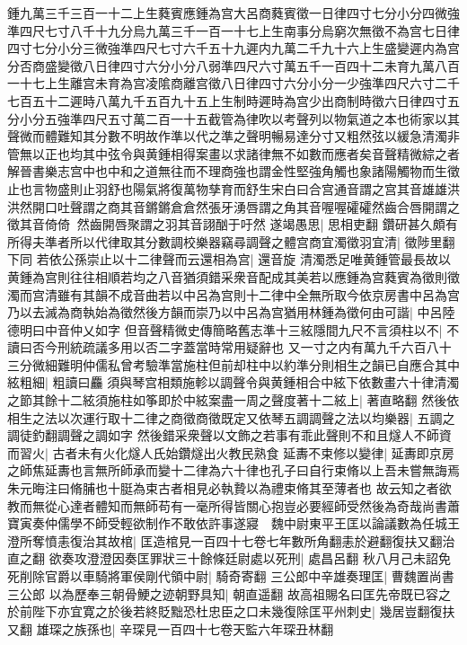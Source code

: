 {鍾九萬三千三百一十二上生蕤賓應鍾為宫大呂商蕤賓徵一日律四寸七分小分四微強準四尺七寸八千十九分烏九萬三千一百一十七上生南事分烏窮次無徵不為宫七日律四寸七分小分三微強準四尺七寸六千五十九遲内九萬二千九十六上生盛變遲内為宫分否商盛變徵八日律四寸六分小分八弱準四尺六寸萬五千一百四十二未育九萬八百一十七上生離宫未育為宫凌隂商離宫徵八日律四寸六分小分一少強準四尺六寸二千七百五十二遲時八萬九千五百九十五上生制時遲時為宫少出商制時徵六日律四寸五分小分五強準四尺五寸萬二百一十五截管為律吹以考聲列以物氣道之本也術家以其聲微而體難知其分數不明故作準以代之準之聲明暢易達分寸又粗然弦以緩急清濁非管無以正也均其中弦令與黄鍾相得案畫以求諸律無不如數而應者矣音聲精微綜之者解晉書樂志宫中也中和之道無往而不理商強也謂金性堅強角觸也象諸陽觸物而生徵止也言物盛則止羽舒也陽氣將復萬物孳育而舒生宋白曰合宫通音謂之宫其音雄雄洪洪然開口吐聲謂之商其音鏘鏘倉倉然張牙湧唇謂之角其音喔喔礭礭然齒合唇開謂之徵其音倚倚然齒開唇聚謂之羽其音詡酗于吁然}
遂竭愚思|{
	思相吏翻}
鑽研甚久頗有所得夫準者所以代律取其分數調校樂器竊尋調聲之體宫商宜濁徵羽宜清|{
	徵陟里翻下同}
若依公孫崇止以十二律聲而云還相為宫|{
	還音旋}
清濁悉足唯黄鍾管最長故以黄鍾為宫則往往相順若均之八音猶須錯采衆音配成其美若以應鍾為宫蕤賓為徵則徵濁而宫清雖有其韻不成音曲若以中呂為宫則十二律中全無所取今依京房書中呂為宫乃以去滅為商執始為徵然後方韻而崇乃以中呂為宫猶用林鍾為徵何由可諧|{
	中呂陸德明曰中音仲乂如字}
但音聲精微史傳簡略舊志準十三絃隱間九尺不言須柱以不|{
	不讀曰否今刑統疏議多用以否二字蓋當時常用疑辭也}
又一寸之内有萬九千六百八十三分微細難明仲儒私曾考驗準當施柱但前却柱中以約準分則相生之韻已自應合其中絃粗細|{
	粗讀曰麤}
須與琴宫相類施軫以調聲令與黄鍾相合中絃下依數畫六十律清濁之節其餘十二絃須施柱如筝即於中絃案盡一周之聲度著十二絃上|{
	著直略翻}
然後依相生之法以次運行取十二律之商徵商徵既定又依琴五調調聲之法以均樂器|{
	五調之調徒釣翻調聲之調如字}
然後錯采衆聲以文飾之若事有乖此聲則不和且燧人不師資而習火|{
	古者未有火化燧人氏始鑽燧出火教民熟食}
延夀不束修以變律|{
	延夀即京房之師焦延夀也言無所師承而變十二律為六十律也孔子曰自行束脩以上吾未嘗無誨焉朱元晦注曰脩脯也十脡為束古者相見必執贄以為禮束脩其至薄者也}
故云知之者欲教而無從心達者體知而無師苟有一毫所得皆關心抱豈必要經師受然後為奇哉尚書蕭寶寅奏仲儒學不師受輕欲制作不敢依許事遂寢　魏中尉東平王匡以論議數為任城王澄所奪憤恚復治其故棺|{
	匡造棺見一百四十七卷七年數所角翻恚於避翻復扶又翻治直之翻}
欲奏攻澄澄因奏匡罪狀三十餘條廷尉處以死刑|{
	處昌呂翻}
秋八月己未詔免死削除官爵以車騎將軍侯剛代領中尉|{
	騎奇寄翻}
三公郎中辛雄奏理匡|{
	曹魏置尚書三公郎}
以為歷奉三朝骨鯁之迹朝野具知|{
	朝直遥翻}
故高祖賜名曰匡先帝既已容之於前陛下亦宜寛之於後若終貶黜恐杜忠臣之口未幾復除匡平州刺史|{
	幾居豈翻復扶又翻}
雄琛之族孫也|{
	辛琛見一百四十七卷天監六年琛丑林翻}
